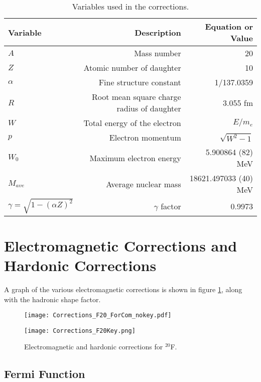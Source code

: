 \documentclass[../MaxHughesThesis.tex]{subfiles}
\begin{document}
\begin{table}[!hbt]
	\centering
	\caption{Variables used in the corrections.}
		\begin{tabular}{lrr}
		Variable & Description & Equation or Value \\ \hline		
		$A$ & Mass number & 20 \\ 
		$Z$ & Atomic number of daughter & 10 \\
		$\alpha$ & Fine structure constant & 1/137.0359\\
		$R$ & Root mean square charge radius of daughter & 3.055 fm \cite{Ang13} \\
		$W$ & Total energy of the electron & $E/m_{e}$ \\
		$p$ & Electron momentum & $\sqrt{W^{2} - 1}$ \\
		$W_{0}$ & Maximum electron energy &  5.900864 (82) MeV \\ 
		$M_{ave}$ & Average nuclear mass &  18621.497033 (40) MeV  \\
		$\gamma = \sqrt{1 - (\alpha Z)^{2}} $ & $\gamma$ factor & 0.9973 
		\end{tabular}
	\label{tab:vars}
\end{table}



\section{Electromagnetic Corrections and Hardonic Corrections}
A graph of the various electromagnetic corrections is shown in figure \ref{fig:corrections}, along with the hadronic shape factor. 

\begin{figure}
    \centering
    \begin{minipage}{0.65\textwidth}
        \centerline{\texttt{[image: Corrections\_F20\_ForCom\_nokey.pdf]}} %
    \end{minipage}\hfill
    \begin{minipage}{0.35\textwidth}
        \centerline{\texttt{[image: Corrections\_F20Key.png]}}
    \end{minipage}
    \caption{Electromagnetic and hardonic corrections for $^{20}$F.}
    \label{fig:corrections}
\end{figure}

\subsection{Fermi Function}
\end{document}
